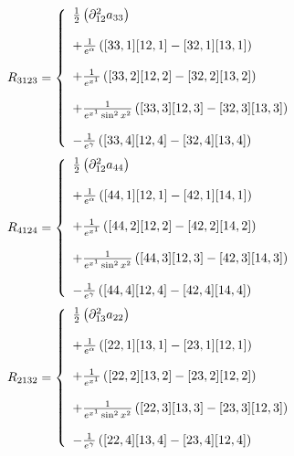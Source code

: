 \begin{align}
R_{3123}&= \left\{\begin{array}{l}
\frac{1}{2}\left(\partial^2_{12} a_{33}\right)\\\\
+ \frac{1}{e^{\alpha}}\left( [33,1] [12,1] -[32,1] [13,1]  \right)\\\\
+ \frac{1}{e^{x^1}}\left( [33,2] [12,2] -[32,2] [13,2]  \right)\\\\
+ \frac{1}{e^{x^1}\sin^2 x^2}\left( [33,3] [12,3] -[32,3] [13,3]  \right)\\\\
-\frac{1}{e^{\gamma}}\left( [33,4] [12,4] -[32,4] [13,4]  \right)
\end {array}\right.\\
\end{align}
\begin{align}
R_{4124}&= \left\{\begin{array}{l}
\frac{1}{2}\left(\partial^2_{12} a_{44}\right)\\\\
+ \frac{1}{e^{\alpha}}\left( [44,1] [12,1] -[42,1] [14,1]  \right)\\\\
+ \frac{1}{e^{x^1}}\left( [44,2] [12,2] -[42,2] [14,2]  \right)\\\\
+ \frac{1}{e^{x^1}\sin^2 x^2}\left( [44,3] [12,3] -[42,3] [14,3]  \right)\\\\
-\frac{1}{e^{\gamma}}\left( [44,4] [12,4] -[42,4] [14,4]  \right)
\end {array}\right.\\
\end{align}
\begin{align}
R_{2132}&= \left\{\begin{array}{l}
\frac{1}{2}\left(\partial^2_{13} a_{22}\right)\\\\
+ \frac{1}{e^{\alpha}}\left( [22,1] [13,1] -[23,1] [12,1]  \right)\\\\
+ \frac{1}{e^{x^1}}\left( [22,2] [13,2] -[23,2] [12,2]  \right)\\\\
+ \frac{1}{e^{x^1}\sin^2 x^2}\left( [22,3] [13,3] -[23,3] [12,3]  \right)\\\\
-\frac{1}{e^{\gamma}}\left( [22,4] [13,4] -[23,4] [12,4]  \right)
\end {array}\right.\\
\end{align}
